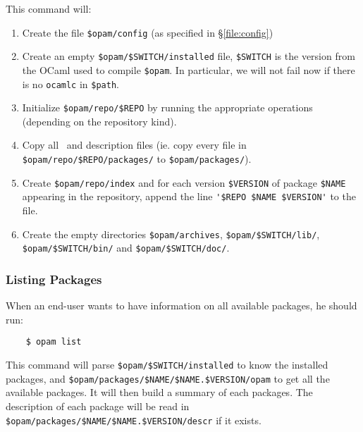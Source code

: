 \documentclass[a4paper,10pt]{article}
\begin{document}
This command will:

\begin{enumerate}

\item Create the file \verb+$opam/config+ (as specified in
  \S\ref{file:config})

\item Create an empty \verb+$opam/$SWITCH/installed+ file,
  \verb+$SWITCH+ %
  is the version from the OCaml used to compile \verb+$opam+.
  In particular, we will not fail now
  if there is no \verb+ocamlc+ in \verb+$path+.

\item Initialize \verb+$opam/repo/$REPO+ by running the
  appropriate operations (depending on the repository kind).

\item Copy all \OPAM\ and description files (ie. copy
  every file in \verb+$opam/repo/$REPO/packages/+ to
  \verb+$opam/packages/+).

\item Create \verb+$opam/repo/index+ and for each version
  \verb+$VERSION+ of package \verb+$NAME+ appearing in the repository,
  append the line \verb+'$REPO $NAME $VERSION'+ to the file.

\item Create the empty directories \verb+$opam/archives+,
  \verb+$opam/$SWITCH/lib/+, \verb+$opam/$SWITCH/bin/+ and \verb+$opam/$SWITCH/doc/+.

\end{enumerate}

\subsubsection{Listing Packages}
\label{opam-list}

When an end-user wants to have information on all available packages,
he should run:

\begin{verbatim}
    $ opam list
\end{verbatim}

This command will parse \verb+$opam/$SWITCH/installed+ to know the
installed packages, and
\verb+$opam/packages/$NAME/$NAME.$VERSION/opam+ to get all the
available packages. It will then build a summary of each packages. The
description of each package will be read in
\verb+$opam/packages/$NAME/$NAME.$VERSION/descr+ if it exists.
\end{document}
